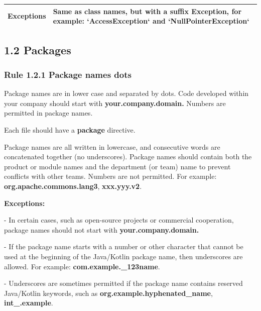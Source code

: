{{{{{{{{{{{{{{{{\begin{center}
\begin{tabular}{ |p{7.5cm}|p{7.5cm}| }
 Exceptions & Same as class names, but with a suffix Exception, for example: `AccessException` and `NullPointerException`\\

\hline

\end{tabular}

\end{center}

\subsection*{\textbf{1.2 Packages}}

\label{sec:1.2}



\subsubsection*{\textbf{Rule 1.2.1 Package names dots}}
\leavevmode\newline

\label{sec:}

Package names are in lower case and separated by dots. Code developed within your company should start with \textbf{your.company.domain.} Numbers are permitted in package names.

Each file should have a \textbf{package} directive.

Package names are all written in lowercase, and consecutive words are concatenated together (no underscores). Package names should contain both the product or module names and the department (or team) name to prevent conflicts with other teams.  Numbers are not permitted. For example: \textbf{org.apache.commons.lang3}, \textbf{xxx.yyy.v2}.



\textbf{Exceptions:} 



- In certain cases, such as open-source projects or commercial cooperation, package names should not start with \textbf{your.company.domain.}

- If the package name starts with a number or other character that cannot be used at the beginning of the Java/Kotlin package name, then underscores are allowed. For example: \textbf{com.example.\_123name}.

- Underscores are sometimes permitted if the package name contains reserved Java/Kotlin keywords, such as \textbf{org.example.hyphenated\_name}, \textbf{int\_.example}.



}}}}}}}}}}}}}}}}
